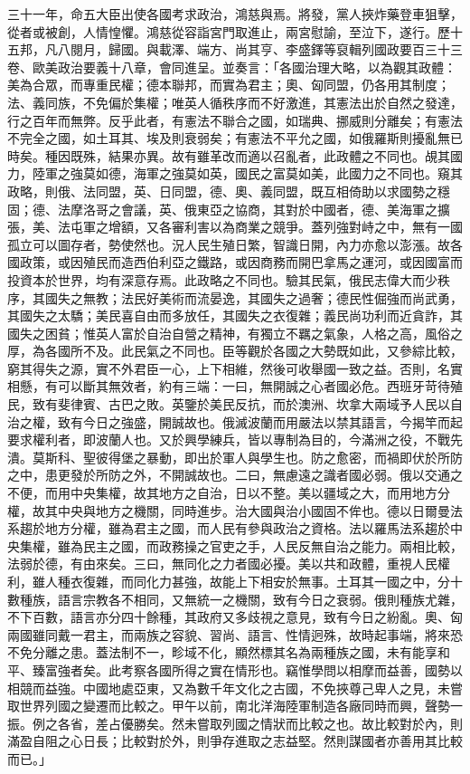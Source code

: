 \begin{pinyinscope}
三十一年，命五大臣出使各國考求政治，鴻慈與焉。將發，黨人挾炸藥登車狙擊，從者或被創，人情惶懼。鴻慈從容詣宮門取進止，兩宮慰諭，至泣下，遂行。歷十五邦，凡八閱月，歸國。與載澤、端方、尚其亨、李盛鐸等裒輯列國政要百三十三卷、歐美政治要義十八章，會同進呈。並奏言：「各國治理大略，以為觀其政體：美為合眾，而專重民權；德本聯邦，而實為君主；奧、匈同盟，仍各用其制度；法、義同族，不免偏於集權；唯英人循秩序而不好激進，其憲法出於自然之發達，行之百年而無弊。反乎此者，有憲法不聯合之國，如瑞典、挪威則分離矣；有憲法不完全之國，如土耳其、埃及則衰弱矣；有憲法不平允之國，如俄羅斯則擾亂無已時矣。種因既殊，結果亦異。故有雖革改而適以召亂者，此政體之不同也。覘其國力，陸軍之強莫如德，海軍之強莫如英，國民之富莫如美，此國力之不同也。窺其政略，則俄、法同盟，英、日同盟，德、奧、義同盟，既互相倚助以求國勢之穩固；德、法摩洛哥之會議，英、俄東亞之協商，其對於中國者，德、美海軍之擴張，美、法屯軍之增額，又各審利害以為商業之競爭。蓋列強對峙之中，無有一國孤立可以圖存者，勢使然也。況人民生殖日繁，智識日開，內力亦愈以澎漲。故各國政策，或因殖民而造西伯利亞之鐵路，或因商務而開巴拿馬之運河，或因國富而投資本於世界，均有深意存焉。此政略之不同也。驗其民氣，俄民志偉大而少秩序，其國失之無教；法民好美術而流晏逸，其國失之過奢；德民性倔強而尚武勇，其國失之太驕；美民喜自由而多放任，其國失之衣復雜；義民尚功利而近貪詐，其國失之困貧；惟英人富於自治自營之精神，有獨立不羈之氣象，人格之高，風俗之厚，為各國所不及。此民氣之不同也。臣等觀於各國之大勢既如此，又參綜比較，窮其得失之源，實不外君臣一心，上下相維，然後可收舉國一致之益。否則，名實相懸，有可以斷其無效者，約有三端：一曰，無開誠之心者國必危。西班牙苛待殖民，致有斐律賓、古巴之敗。英鑒於美民反抗，而於澳洲、坎拿大兩域予人民以自治之權，致有今日之強盛，開誠故也。俄滅波蘭而用嚴法以禁其語言，今揭竿而起要求權利者，即波蘭人也。又於興學練兵，皆以專制為目的，今滿洲之役，不戰先潰。莫斯科、聖彼得堡之暴動，即出於軍人與學生也。防之愈密，而禍即伏於所防之中，患更發於所防之外，不開誠故也。二曰，無慮遠之識者國必弱。俄以交通之不便，而用中央集權，故其地方之自治，日以不整。美以疆域之大，而用地方分權，故其中央與地方之機關，同時進步。治大國與治小國固不侔也。德以日爾曼法系趨於地方分權，雖為君主之國，而人民有參與政治之資格。法以羅馬法系趨於中央集權，雖為民主之國，而政務操之官吏之手，人民反無自治之能力。兩相比較，法弱於德，有由來矣。三曰，無同化之力者國必擾。美以共和政體，重視人民權利，雖人種衣復雜，而同化力甚強，故能上下相安於無事。土耳其一國之中，分十數種族，語言宗教各不相同，又無統一之機關，致有今日之衰弱。俄則種族尤雜，不下百數，語言亦分四十餘種，其政府又多歧視之意見，致有今日之紛亂。奧、匈兩國雖同戴一君主，而兩族之容貌、習尚、語言、性情迥殊，故時起事端，將來恐不免分離之患。蓋法制不一，畛域不化，顯然標其名為兩種族之國，未有能享和平、臻富強者矣。此考察各國所得之實在情形也。竊惟學問以相摩而益善，國勢以相競而益強。中國地處亞東，又為數千年文化之古國，不免挾尊己卑人之見，未嘗取世界列國之變遷而比較之。甲午以前，南北洋海陸軍制造各廠同時而興，聲勢一振。例之各省，差占優勝矣。然未嘗取列國之情狀而比較之也。故比較對於內，則滿盈自阻之心日長；比較對於外，則爭存進取之志益堅。然則謀國者亦善用其比較而已。」


\end{pinyinscope}
